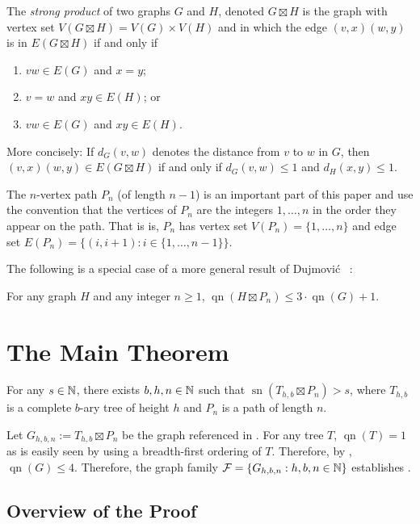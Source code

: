 \documentclass[kpfonts]{patmorin}
\DeclareMathOperator{\sn}{sn}
\DeclareMathOperator{\qn}{qn}
\begin{document}
The \emph{strong product} of two graphs $G$ and $H$, denoted $G\boxtimes H$ is the graph with vertex set $V(G\boxtimes H)=V(G)\times V(H)$ and in which the edge $(v,x)(w,y)$ is in $E(G\boxtimes H)$ if and only if
\begin{enumerate}
  \item $vw\in E(G)$ and $x=y$;
  \item $v=w$ and $xy\in E(H)$; or
  \item $vw\in E(G)$ and $xy\in E(H)$.
\end{enumerate}
More concisely: If $d_G(v,w)$ denotes the distance from $v$ to $w$ in $G$, then $(v,x)(w,y)\in E(G\boxtimes H)$ if and only if $d_G(v,w)\le 1$ and $d_H(x,y)\le 1$.

The $n$-vertex path $P_n$ (of length $n-1$) is an important part of this paper and use the convention that the vertices of $P_n$ are the integers $1,\ldots,n$ in the order they appear on the path. That is is, $P_n$ has vertex set $V(P_n)=\{1,\ldots,n\}$ and edge set $E(P_n)=\{(i,i+1):i\in\{1,\ldots,n-1\}\}$.

The following is a special case of a more general result of Dujmović \etal~\cite[Lemma~8]{XXX}:

\begin{cor}
  For any graph $H$ and any integer $n\ge 1$, $\qn(H\boxtimes P_n)\le 3\cdot\qn(G)+1$. 
\end{cor}


\section{The Main Theorem}

\begin{thm}
  For any $s\in\mathbb{N}$, there exists $b,h,n\in\mathbb{N}$ such that $\sn(T_{h,b}\boxtimes P_n)>s$, where $T_{h,b}$ is a complete $b$-ary tree of height $h$ and $P_n$ is a path of length $n$.
\end{thm}

Let $G_{h,b,n}:=T_{h,b}\boxtimes P_n$ be the graph referenced in .
For any tree $T$, $\qn(T)=1$ as is easily seen by using a breadth-first ordering of $T$.  Therefore, by , $\qn(G)\le 4$.  Therefore, the graph family $\mathcal{F}=\{G_{h,b,n}:h,b,n\in\mathbb{N}\}$ establishes .


\subsection{Overview of the Proof}
\end{document}

